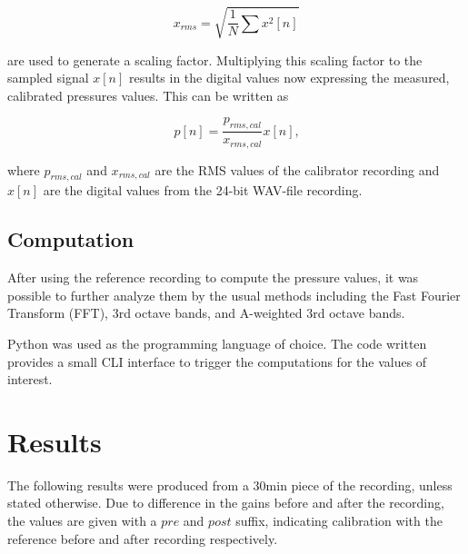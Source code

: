 \documentclass[twocolumn]{article}
\begin{document}
\begin{equation}
    x_{rms} = \sqrt{\frac{1}{N}\sum x^2\left[n\right]}
\end{equation}

are used to generate a scaling factor.
Multiplying this scaling factor to the sampled signal $x[n]$ results in the digital
values now expressing the measured, calibrated pressures values.
This can be written as

\begin{equation}
    p\left[n\right] = \frac{p_{rms,cal}}{x_{rms,cal}}x\left[n\right]\textrm{,}
\end{equation}

where $p_{rms,cal}$ and $x_{rms,cal}$ are the RMS values of the calibrator recording
and $x\left[n\right]$ are the digital values from the 24-bit WAV-file recording.

\subsection{Computation}
After using the reference recording to compute the pressure values, it was possible
to further analyze them by the usual methods including the Fast Fourier Transform
(FFT), 3rd octave bands, and A-weighted 3rd octave bands.

Python was used as the programming language of choice.
The code written provides a small CLI interface to trigger the computations for the
values of interest.

\section{Results}
The following results were produced from a $30\textrm{min}$ piece of the recording, unless stated otherwise.
Due to difference in the gains before and after the recording, the values are given with a $pre$ and $post$ suffix,
indicating calibration with the reference before and after recording respectively.
\end{document}
